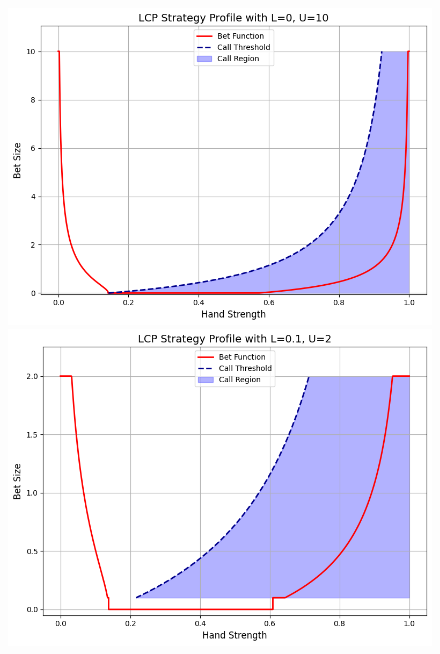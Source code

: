 \documentclass[../../main/main.tex]{subfiles}
\begin{document}
\begin{figure}[h!]
    \begin{adjustwidth}{-1in}{-1in}
        \centering
        \begin{minipage}{0.6\textwidth}
            \centering
            \includegraphics[width=\textwidth]{images/LCP_profile_0_10.png}
        \end{minipage}
        \hspace{0.05\textwidth}
        \begin{minipage}{0.6\textwidth}
            \centering
            \includegraphics[width=\textwidth]{images/LCP_profile_0.1_2.png}
        \end{minipage}
        \vspace{0.5cm}\\

\end{adjustwidth}
\end{figure}
\end{document}
